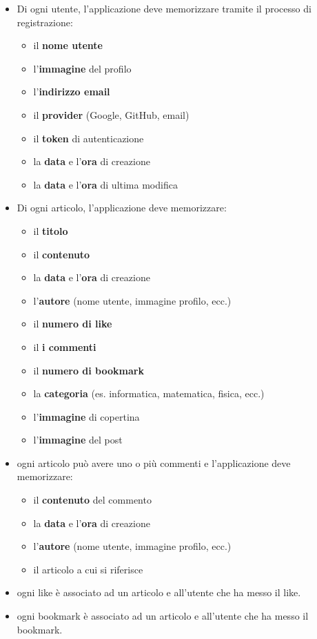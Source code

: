 \documentclass{article}
\begin{document}
    \begin{itemize}
        \item Di ogni utente, l'applicazione deve memorizzare tramite il processo di registrazione:
        \begin{itemize}
            \item il \textbf{nome utente}
            \item l'\textbf{immagine} del profilo
            \item l'\textbf{indirizzo email}
            \item il \textbf{provider} (Google, GitHub, email)
            \item il \textbf{token} di autenticazione
            \item la \textbf{data} e l'\textbf{ora} di creazione
            \item la \textbf{data} e l'\textbf{ora} di ultima modifica
        \end{itemize}
        \item Di ogni articolo, l'applicazione deve memorizzare:
        \begin{itemize}
            \item il \textbf{titolo}
            \item il \textbf{contenuto}
            \item la \textbf{data} e l'\textbf{ora} di creazione
            \item l'\textbf{autore} (nome utente, immagine profilo, ecc.)
            \item il \textbf{numero di like}
            \item il \textbf{i commenti}
            \item il \textbf{numero di bookmark}
            \item la \textbf{categoria} (es. informatica, matematica, fisica, ecc.)
            \item l'\textbf{immagine} di copertina
            \item l'\textbf{immagine} del post
        \end{itemize}
        \item ogni articolo può avere uno o più commenti e l'applicazione deve memorizzare:
        \begin{itemize}
            \item il \textbf{contenuto} del commento
            \item la \textbf{data} e l'\textbf{ora} di creazione
            \item l'\textbf{autore} (nome utente, immagine profilo, ecc.)
            \item il articolo a cui si riferisce
        \end{itemize}
        \item ogni like è associato ad un articolo e all'utente che ha messo il like.\\
        \item ogni bookmark è associato ad un articolo e all'utente che ha messo il bookmark.
    \end{itemize}
\end{document}

